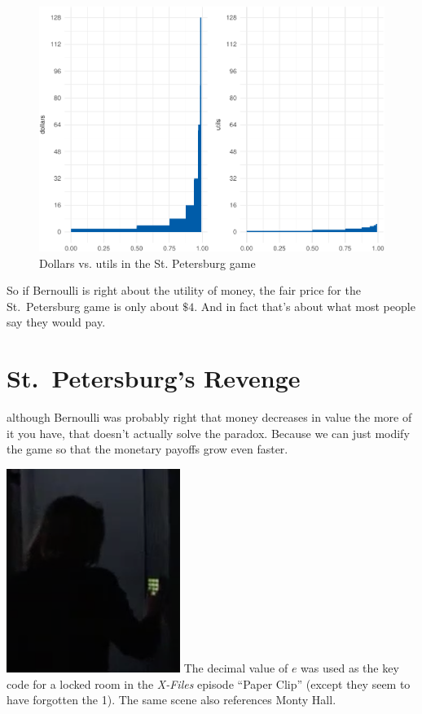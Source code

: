 \documentclass[justified]{tufte-book}
\theoremstyle{definition}
\theoremstyle{definition}
\theoremstyle{definition}
\theoremstyle{remark}
\begin{document}
\begin{figure}
\includegraphics{_main_files/figure-latex/logstp-1} \caption[Dollars vs]{Dollars vs. utils in the St. Petersburg game}\label{fig:logstp}
\end{figure}

So if Bernoulli is right about the utility of money, the fair price for
the St.~Petersburg game is only about \(\$4\). And in fact that's about
what most people say they would pay.

\hypertarget{st.petersburgs-revenge}{%
\section{St.~Petersburg's Revenge}\label{st.petersburgs-revenge}}

 although Bernoulli was probably right that
money decreases in value the more of it you have, that doesn't actually
solve the paradox. Because we can just modify the game so that the
monetary payoffs grow even faster.

\begin{marginfigure}
\includegraphics{img/xfiles.png} The decimal value of \(e\) was used as
the key code for a locked room in the \emph{X-Files} episode ``Paper
Clip'' (except they seem to have forgotten the 1). The same scene also
references Monty Hall.
\end{marginfigure}
\end{document}
